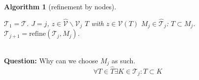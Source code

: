 \documentclass[a4paper,12pt,oneside,fleqn]{book}
\newtheorem{algorithm}{Algorithm}[section]
\theoremstyle{definition}
\theoremstyle{remark}
\begin{document}
\begin{algorithm}[refinement by nodes]
\begin{algorithmic}
\State $\mathcal{T}_1 = \mathcal{T}$. 
\State $J = j$,  
\Else 
\State {} $z \in \hat{\mathcal{V}} \backslash \mathcal{V}_j$ 
\State {} $T$ with $z \in \mathcal{V}(T)$
\State {} $M_j \in \hat{\mathcal{T}}_j$: $T \subset M_j$. 
\State $\mathcal{T}_{j + 1} = \text{refine}(\mathcal{T}_j, M_j)$. 
\EndIf	
\EndFor
\end{algorithmic}
\end{algorithm}
\quad\\
\textbf{Question:} Why can we choose $M_j$ as such. 
\begin{equation}
	\forall T \in \hat{T} \exists K \in \mathcal{T}_j: T \subset K
\end{equation}
\end{document}
